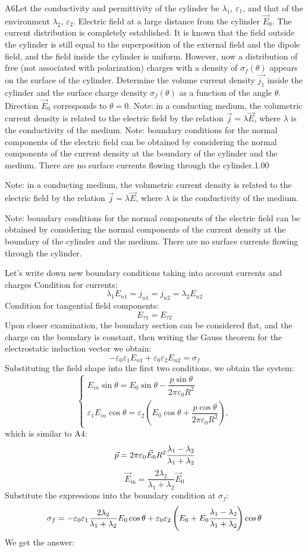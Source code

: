 \documentclass[11pt,a4paper]{article}
\begin{document}
\begin{solcard}{A6}{Let the conductivity and permittivity of the cylinder be $\lambda_1$, $\varepsilon_1$, and that of the environment $\lambda_2$, $\varepsilon_2$. Electric field at a large distance from the cylinder $\vec{E}_0$. The current distribution is completely established. It is known that the field outside the cylinder is still equal to the superposition of the external field and the dipole field, and the field inside the cylinder is uniform. However, now a distribution of free (not associated with polarization) charges with a density of $\sigma_f(\theta)$ appears on the surface of the cylinder. Determine the volume current density $\vec{j_1}$ inside the cylinder and the surface charge density $\sigma_f (\theta)$ as a function of the angle $\theta$. Direction $\vec{E}_0$ corresponds to $\theta = 0$. Note: in a conducting medium, the volumetric current density is related to the electric field by the relation $\vec{j} =\lambda \vec{E}$, where $\lambda$ is the conductivity of the medium. Note: boundary conditions for the normal components of the electric field can be obtained by considering the normal components of the current density at the boundary of the cylinder and the medium. There are no surface currents flowing through the cylinder.}{1.00}

Note: in a conducting medium, the volumetric current density is related to the electric field by the relation $\vec{j} =\lambda \vec{E}$, where $\lambda$ is the conductivity of the medium.


Note: boundary conditions for the normal components of the electric field can be obtained by considering the normal components of the current density at the boundary of the cylinder and the medium. There are no surface currents flowing through the cylinder.


Let's write down new boundary conditions taking into account currents and charges Condition for currents: \[\lambda_1 E_{n1} = j_{n1} = j_{n2} = \lambda_2 E_{n2}\]Condition for tangential field components: \[E_{\tau1} = E_{\tau2}\]Upon closer examination, the boundary section can be considered flat, and the charge on the boundary is constant, then writing the Gauss theorem for the electrostatic induction vector we obtain: \[-\varepsilon_0\varepsilon_1E_{n1} + \varepsilon_0\varepsilon_2E_{n2} = \sigma_f\]Substituting the field shape into the first two conditions, we obtain the system: \[\begin{cases}E_{in}\sin\theta=E_0\sin\theta-\dfrac{p\sin\theta}{2\pi \varepsilon_0R^2}\\\varepsilon _1E_{in}\cos\theta=\varepsilon _2\left(E_0\cos\theta+\dfrac{p\cos\theta}{2\pi \varepsilon_0R^2}\right),\end{cases}\]which is similar to A4: \[\vec p=2\pi\varepsilon_0\vec E_0R^2\cfrac{\lambda_1-\lambda_2}{\lambda_1+\lambda_2}\]\[\vec{E}_{\text{in}} = \frac{2\lambda_2}{\lambda_1 + \lambda_2} \vec{E}_0\]Substitute the expressions into the boundary condition at $\sigma_f$: \[\sigma_f = -\varepsilon_0\varepsilon _1\frac{2\lambda_2}{\lambda_1 + \lambda_2} E_0\cos\theta+\varepsilon_0\varepsilon _2\left(E_0+E_0\cfrac{\lambda_1-\lambda_2}{\lambda_1+\lambda_2}\right)\cos\theta\]We get the answer:


\end{solcard}
\end{document}

